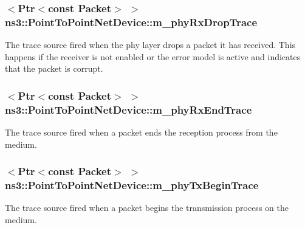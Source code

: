 \subsubsection[{\texorpdfstring{m\+\_\+phy\+Rx\+Drop\+Trace}{m_phyRxDropTrace}}]{$<${\bf Ptr}$<$const {\bf Packet}$>$ $>$ ns3\+::\+Point\+To\+Point\+Net\+Device\+::m\+\_\+phy\+Rx\+Drop\+Trace\hspace{0.3cm}{\ttfamily [private]}}\hypertarget{classns3_1_1PointToPointNetDevice_a8c980fe1c80f3e7c084e489e0176aeda}{}\label{classns3_1_1PointToPointNetDevice_a8c980fe1c80f3e7c084e489e0176aeda}
The trace source fired when the phy layer drops a packet it has received. This happens if the receiver is not enabled or the error model is active and indicates that the packet is corrupt. 
\subsubsection[{\texorpdfstring{m\+\_\+phy\+Rx\+End\+Trace}{m_phyRxEndTrace}}]{$<${\bf Ptr}$<$const {\bf Packet}$>$ $>$ ns3\+::\+Point\+To\+Point\+Net\+Device\+::m\+\_\+phy\+Rx\+End\+Trace\hspace{0.3cm}{\ttfamily [private]}}\hypertarget{classns3_1_1PointToPointNetDevice_a087003567f5836b7dafda69423dda203}{}\label{classns3_1_1PointToPointNetDevice_a087003567f5836b7dafda69423dda203}
The trace source fired when a packet ends the reception process from the medium. 
\subsubsection[{\texorpdfstring{m\+\_\+phy\+Tx\+Begin\+Trace}{m_phyTxBeginTrace}}]{$<${\bf Ptr}$<$const {\bf Packet}$>$ $>$ ns3\+::\+Point\+To\+Point\+Net\+Device\+::m\+\_\+phy\+Tx\+Begin\+Trace\hspace{0.3cm}{\ttfamily [private]}}\hypertarget{classns3_1_1PointToPointNetDevice_aa75567144b7715713970bb575ebd26cf}{}\label{classns3_1_1PointToPointNetDevice_aa75567144b7715713970bb575ebd26cf}
The trace source fired when a packet begins the transmission process on the medium. 
